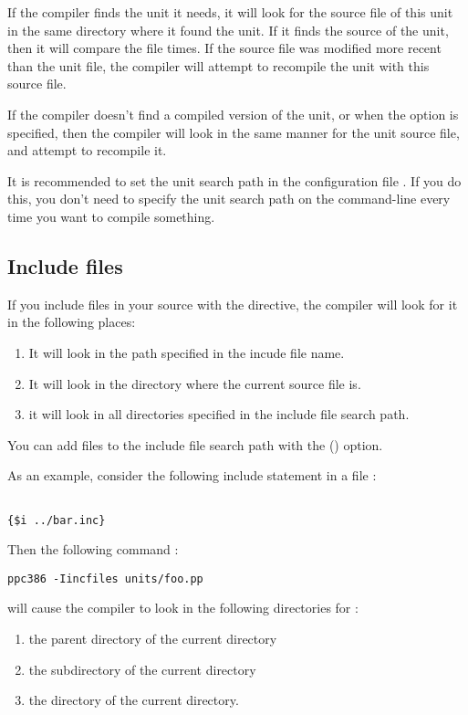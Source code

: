 \documentclass{book}
\begin{document}
If the compiler finds the unit it needs, it will look for the source file of
this unit in the same directory where it found the unit.
If it finds the source of the unit, then it will compare the file times.
If the source file was modified more recent than the unit file, the
compiler will attempt to recompile the unit with this source file.

If the compiler doesn't find a compiled version of the unit, or when the
 option is specified, then the compiler will look in the same
manner for the unit source file, and attempt to recompile it.

It is recommended to set the unit search path in the configuration file
. If you do this, you don't need to specify the unit search
path on the command-line every time you want to compile something.

\subsection{Include files}
If you include files in your source with the 
directive, the compiler will look for it in the following places:

\begin{enumerate}
\item It will look in the path specified in the incude file name.
\item It will look in the directory where the current source file is.
\item it will look in all directories specified in the include file search
path.
\end{enumerate}
You can add files to the include file search
 path with the  ()
option.

As an example, consider the following include statement in a file
:
\begin{verbatim}

{$i ../bar.inc}

\end{verbatim}
Then the following command :
\begin{verbatim}
ppc386 -Iincfiles units/foo.pp
\end{verbatim}
will cause the compiler to look in the following directories for
:
\begin{enumerate}
\item the parent directory of the current directory
\item the  subdirectory of the current directory
\item the  directory of the current directory.
\end{enumerate}
\end{document}
